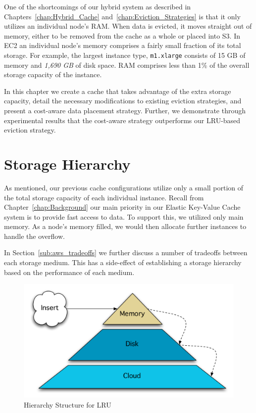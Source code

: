 One of the shortcomings of our hybrid system as described in
Chapters~\ref{chap:Hybrid_Cache} and~\ref{chap:Eviction_Strategies} is that it
only utilizes an individual node's RAM\@. When data is evicted, it moves
straight out of memory, either to be removed from the cache as a whole or
placed into S3. In EC2 an individual node's memory comprises a fairly small
fraction of its total storage. For example, the largest instance type,
{\tt m1.xlarge} consists of 15 GB of memory and \emph{1,690 GB} of disk space.
RAM comprises less than 1\% of the overall storage capacity of the instance.

In this chapter we create a cache that takes advantage of the extra storage
capacity, detail the necessary modifications to existing eviction strategies,
and present a cost-aware data placement strategy. Further, we demonstrate
through experimental results that the cost-aware strategy outperforms our
LRU-based eviction strategy.

\section{Storage Hierarchy} %
\label{sec:storage_hierarchy}
As mentioned, our previous cache configurations utilize only a small portion of
the total storage capacity of each individual instance. Recall from
Chapter~\ref{chap:Background} our main priority in our Elastic Key-Value Cache
system is to provide fast access to data. To support this, we utilized only
main memory. As a node's memory filled, we would then allocate further
instances to handle the overflow.

In Section~\ref{sub:aws_tradeoffs} we further discuss a number of tradeoffs
between each storage medium. This has a side-effect of establishing a storage
hierarchy based on the performance of each medium.

\begin{figure}
\begin{center}
\includegraphics[scale=0.5]{figures/hierarchy-lru.pdf}
\end{center}
\caption{Hierarchy Structure for LRU}
\label{fig:hierarchy_lru}
\end{figure}

